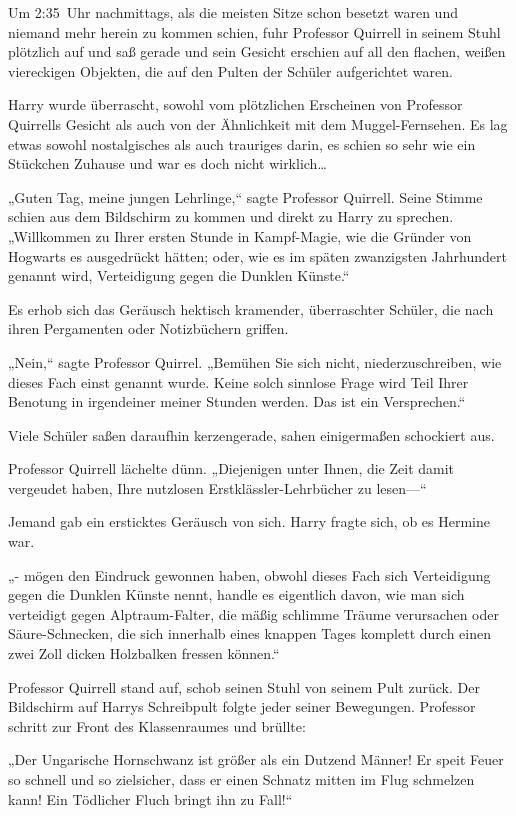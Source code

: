 {\later

Um 2:35~Uhr nachmittags, als die meisten Sitze schon besetzt waren und niemand mehr herein zu kommen schien, fuhr Professor Quirrell in seinem Stuhl plötzlich auf und saß gerade und sein Gesicht erschien auf all den flachen, weißen viereckigen Objekten, die auf den Pulten der Schüler aufgerichtet waren.

Harry wurde überrascht, sowohl vom plötzlichen Erscheinen von Professor Quirrells Gesicht als auch von der Ähnlichkeit mit dem Muggel-Fernsehen. Es lag etwas sowohl nostalgisches als auch trauriges darin, es schien so sehr wie ein Stückchen Zuhause und war es doch nicht wirklich…

„Guten Tag, meine jungen Lehrlinge,“ sagte Professor Quirrell. Seine Stimme schien aus dem Bildschirm zu kommen und direkt zu Harry zu sprechen. „Willkommen zu Ihrer ersten Stunde in Kampf-Magie, wie die Gründer von Hogwarts es ausgedrückt hätten; oder, wie es im späten zwanzigsten Jahrhundert genannt wird, Verteidigung gegen die Dunklen Künste.“

Es erhob sich das Geräusch hektisch kramender, überraschter Schüler, die nach ihren Pergamenten oder Notizbüchern griffen.

„Nein,“ sagte Professor Quirrel. „Bemühen Sie sich nicht, niederzuschreiben, wie dieses Fach einst genannt wurde. Keine solch sinnlose Frage wird Teil Ihrer Benotung in irgendeiner meiner Stunden werden. Das ist ein Versprechen.“

Viele Schüler saßen daraufhin kerzengerade, sahen einigermaßen schockiert aus.

Professor Quirrell lächelte dünn. „Diejenigen unter Ihnen, die Zeit damit vergeudet haben, Ihre nutzlosen Erstklässler-Lehrbücher zu lesen—“

Jemand gab ein ersticktes Geräusch von sich. Harry fragte sich, ob es Hermine war.

„- mögen den Eindruck gewonnen haben, obwohl dieses Fach sich Verteidigung gegen die Dunklen Künste nennt, handle es eigentlich davon, wie man sich verteidigt gegen Alptraum-Falter, die mäßig schlimme Träume verursachen oder Säure-Schnecken, die sich innerhalb eines knappen Tages komplett durch einen zwei Zoll dicken Holzbalken fressen können.“

Professor Quirrell stand auf, schob seinen Stuhl von seinem Pult zurück. Der Bildschirm auf Harrys Schreibpult folgte jeder seiner Bewegungen. Professor schritt zur Front des Klassenraumes und brüllte:

„Der Ungarische Hornschwanz ist größer als ein Dutzend Männer! Er speit Feuer so schnell und so zielsicher, dass er einen Schnatz mitten im Flug schmelzen kann! Ein Tödlicher Fluch bringt ihn zu Fall!“

}
